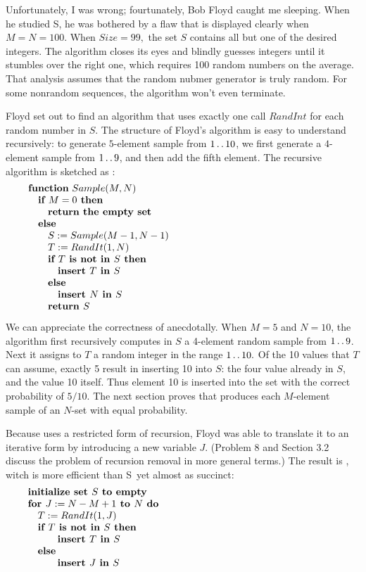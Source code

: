 Unfortunately, I was wrong; fourtunately, Bob Floyd caught me sleeping. When he
studied \Alg S, he was bothered by a flaw that is displayed clearly
when $M=N=100.$ When $Size=99,$ the set $S$ contains all but one of the desired
integers. The algorithm closes its eyes and blindly guesses integers until it
stumbles over the right one, which requires 100 random numbers on the average.
That analysis assumes that the random nubmer generator is truly random. For some
nonrandom sequences, the algorithm won't even terminate.

Floyd set out to find an algorithm that uses exactly one call $RandInt$ for each
random number in $S$. The structure of Floyd's algorithm is easy to understand
recursively: to generate $5$-element sample from $1\mathinner{\ldotp\ldotp}10$, we first generate
a $4$-element sample from $1\mathinner{\ldotp\ldotp}9$, and then add the fifth element. The
recursive algorithm is sketched as :
$$\vbox{\let\par=\endgraf
\obeylines\sfcode`;=3000
{\bf function} $Sample(M, N)$
\quad {\bf if $M=0$ then}
\qquad {\bf return the empty set}
\quad {\bf else}
\qquad $S:=Sample(M-1, N-1)$
\qquad $T:=RandIt(1,N)$
\qquad {\bf if $T$ is not in $S$ then}
\qquad\quad {\bf insert $T$ in $S$}
\qquad {\bf else}
\qquad\quad {\bf insert $N$ in $S$}
\qquad {\bf return $S$}
}$$

We can appreciate the correctness of  anecdotally. When
$M=5$ and $N=10$, the algorithm first recursively computes in $S$ a 4-element
random sample from $1\mathinner{\ldotp\ldotp}9$. Next it assigns to $T$ a random integer in the
range $1\mathinner{\ldotp\ldotp}10.$ Of the 10 values that $T$ can assume, exactly 5 result in
inserting 10 into $S$: the four value already in $S$, and the value 10 itself.
Thus element 10 is inserted into the set with the correct probability of $5/10$.
The next section proves that  produces each $M$-element sample
of an $N$-set with equal probability.

Because  uses a restricted form of recursion, Floyd was able to
translate it to an iterative form by introducing a new variable $J$. (Problem 8
and Section 3.2 discuss the problem of recursion removal in more general terms.)
The result is , witch is more efficient than \Alg S\ yet almost as
succinct:
$$\vbox{\let\par=\endgraf
\obeylines\sfcode`;=3000
{\bf initialize set $S$ to empty}
{\bf for $J:=N-M+1$ to $N$ do}
\quad $T:=RandIt(1,J)$
\quad {\bf if $T$ is not in $S$ then}
\qquad\quad {\bf insert $T$ in $S$}
\quad {\bf else}
\qquad\quad {\bf insert $J$ in $S$}
}$$

